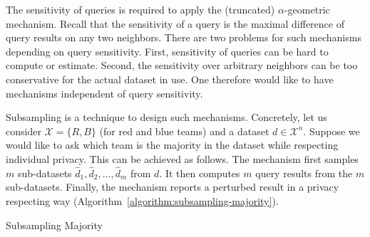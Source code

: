 
The sensitivity of queries is required to apply the (truncated)
$\alpha$-geometric mechanism. Recall that the sensitivity of a query
is the maximal difference of query results on any two neighbors. There are
two problems for such mechanisms depending on query sensitivity. First, 
sensitivity of queries can be hard to compute or estimate. Second,
the sensitivity over arbitrary neighbors can be too conservative for
the actual dataset in use. One therefore would like to have
mechanisms independent of query sensitivity.

Subsampling is a technique to design such mechanisms. Concretely, let
us consider $\mathcal{X} = \{ R, B \}$ (for red and blue teams) and a
dataset $d \in \mathcal{X}^n$. Suppose we would like to ask which team
is the majority in the dataset while respecting individual
privacy. This can be achieved as follows. The mechanism first samples $m$
sub-datasets $\hat{d}_1, \hat{d}_2, \ldots, \hat{d}_m$ from
$d$. It then computes $m$ query results from the $m$
sub-datasets. Finally, the mechanism reports a perturbed result in a
privacy respecting way
(Algorithm~\ref{algorithm:subsampling-majority}). 


\begin{algorithm}
  \begin{algorithmic}[1]
    \Else
      \State{\Return {$\bot$}}
    \EndIf
  \EndFunction
  \end{algorithmic}
  \caption{Subsampling Majority}
  \label{algorithm:subsampling-majority}
\end{algorithm}

